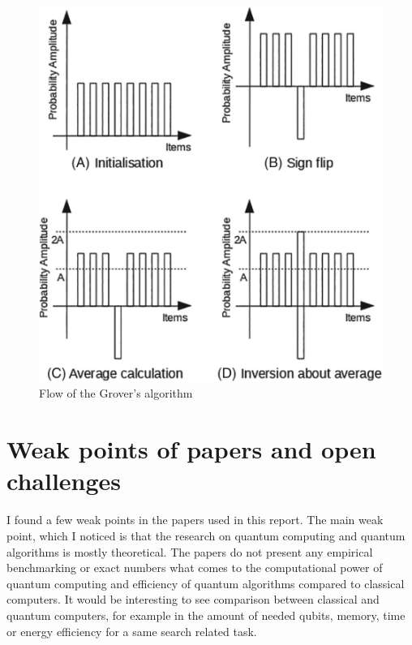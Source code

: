 \documentclass[english,oneside,openright]{UH_DS_report}
\begin{document}
\begin{figure}[h]
\caption{Flow of the Grover's algorithm}
\label{groverflow}
\centering
\includegraphics[width=\linewidth]{images/grover-flow.png}
\end{figure}

\chapter{Weak points of papers and open challenges}
\label{chapter:weakpoints}

I found a few weak points in the papers used in this report. The main weak point, which I noticed is that the research on quantum computing and quantum algorithms is mostly theoretical. The papers do not present any empirical benchmarking or exact numbers what comes to the computational power of quantum computing and efficiency of quantum algorithms compared to classical computers. It would be interesting to see comparison between classical and quantum computers, for example in the amount of needed qubits, memory, time or energy efficiency for a same search related task.
\end{document}
